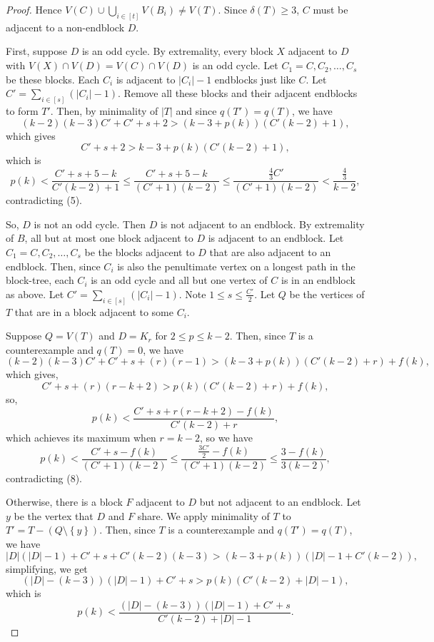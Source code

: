 \documentclass[12pt]{article}
\theoremstyle{plain}
\theoremstyle{definition}
\theoremstyle{remark}
\newcommand{\set}[1]{\left\{ #1 \right\}}
\newcommand{\card}[1]{\left|#1\right|}
\newcommand{\irange}[1]{\left[#1\right]}
\newcommand{\parens}[1]{\left( #1 \right)}
\begin{document}
\begin{proof}
		 Hence $V(C) \cup \bigcup_{i \in \irange{t}} V(B_i) \ne V(T)$.  Since $\delta(T) \ge 3$, $C$ must be adjacent to a non-endblock $D$.
		 
		 First, suppose $D$ is an odd cycle.  By extremality, every block $X$ adjacent to $D$ with $V(X) \cap V(D) = V(C) \cap V(D)$ is an odd cycle. Let $C_1 = C, C_2, \ldots, C_s$ be these blocks.  Each $C_i$ is adjacent to $|C_i| - 1$ endblocks just like $C$.   Let $C' = \sum_{i \in \irange{s}} \parens{\card{C_i} - 1}$. Remove all these blocks and their adjacent endblocks to form $T'$.  Then, by minimality of $\card{T}$ and since $q(T') = q(T)$, we have
		 \[(k-2)(k-3)C' + C' + s + 2 > (k-3 + p(k))(C'(k-2) + 1),\]
		 which gives
		 \[C' + s + 2 > k-3 + p(k)(C'(k-2) + 1),\]
		 which is
		 \[p(k) < \frac{C' + s + 5 - k}{C'(k-2) + 1} \le \frac{C' + s + 5 - k}{(C'+1)(k-2)} \le \frac{\frac43 C'}{(C'+1)(k-2)} < \frac{\frac43}{k-2},\]
		 contradicting (5).		 
		 
		 So, $D$ is not an odd cycle.  Then $D$ is not adjacent to an endblock.  By extremality of $B$, all but at most one block adjacent to $D$ is adjacent to an endblock.  Let $C_1 = C, C_2, \ldots, C_s$ be the blocks adjacent to $D$ that are also adjacent to an endblock.  Then, since $C_i$ is also the penultimate vertex on a longest path in the block-tree, each $C_i$ is an odd cycle and all but one vertex of $C$ is in an endblock as above.  Let $C' = \sum_{i \in \irange{s}} \parens{\card{C_i} - 1}$. Note $1 \le s \le \frac{C'}{2}$.  Let $Q$ be the vertices of $T$ that are in a block adjacent to some $C_i$.
		 
		 Suppose $Q = V(T)$ and $D = K_r$ for $2 \le p \le k-2$. Then, since $T$ is a counterexample and $q(T) = 0$, we have
		 \[(k-2)(k-3)C' + C' + s + (r)(r-1) > (k-3 + p(k))(C'(k-2) + r) + f(k),\]
		 which gives,
		 \[C' + s + (r)(r - k + 2) > p(k)(C'(k-2) + r) + f(k),\]
		 so,
		 \[p(k) < \frac{C' + s + r(r - k + 2) - f(k)}{C'(k-2) + r},\]
		 which achieves its maximum when $r = k-2$, so we have
		\[p(k) < \frac{C' + s - f(k)}{(C'+1)(k-2)} \le \frac{\frac{3C'}{2} - f(k)}{(C'+1)(k-2)} \le \frac{3-f(k)}{3(k-2)},\]
		contradicting (8).
		 
		 Otherwise, there is a block $F$ adjacent to $D$ but not adjacent to an endblock.  Let $y$ be the vertex that $D$ and $F$ share.  We apply minimality of $T$ to $T'= T - (Q \setminus \set{y})$.   Then, since $T$ is a counterexample and $q(T') = q(T)$, we have
		 \[\card{D}(\card{D}-1) + C' + s + C'(k-2)(k-3) > (k-3 + p(k))(\card{D} - 1 + C'(k-2)),\]
		 simplifying, we get
		 \[(\card{D} - (k-3))(\card{D}-1) + C' + s > p(k)(C'(k-2) + \card{D} - 1),\]
		 which is
		 \[p(k) < \frac{(\card{D} - (k-3))(\card{D}-1) + C' + s}{C'(k-2) + \card{D} - 1}.\]
		 

\end{proof}
\end{document}
